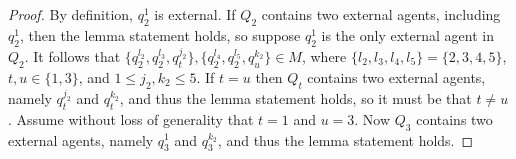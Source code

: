 \begin{proof}
By definition, $q_2^1$ is external. If $Q_2$ contains two external agents, including $q_2^1$, then the lemma statement holds, so suppose $q_2^1$ is the only external agent in $Q_2$. 
It follows that $\{ q_2^{l_2}, q_2^{l_3}, q_t^{j_2} \}, \{ q_2^{l_4}, q_2^{l_5}, q_u^{k_2} \} \in M$, where $\{ l_2, l_3, l_4, l_5 \} = \{ 2, 3, 4, 5 \}$, $t, u \in \{ 1, 3 \}$, and $1\leq {j_2}, {k_2} \leq 5$. If $t = u$ then $Q_t$ contains two external agents, namely $q_t^{j_2}$ and $q_t^{k_2}$, and thus the lemma statement holds, so it must be that $t \neq u$. Assume without loss of generality that $t=1$ and $u=3$. Now $Q_3$ contains two external agents, namely $q_3^1$ and $q_3^{k_2}$, and thus the lemma statement holds.
\end{proof}



